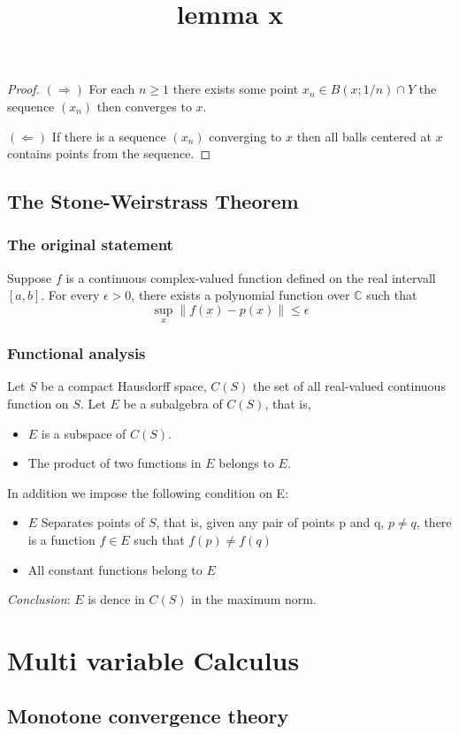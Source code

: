 \documentclass[titlepage]{article}
\begin{document}
\begin{proof}
\title{lemma x}
$(\Rightarrow)$ For each $n\geq 1$ there exists some point $x_n \in B(x;1/n)\cap Y$ the sequence $(x_n)$ then converges to $x$.

$(\Leftarrow)$  If there is a sequence $(x_n)$ converging to $x$ then all balls centered at $x$ contains points from the sequence.
\end{proof}
\subsection{The Stone-Weirstrass Theorem}
\subsubsection{The original statement}
Suppose $f$ is a continuous complex-valued function defined on the real intervall $[a,b]$. For every $\epsilon>0$, there exists a polynomial function over $\mathbb{C}$ such that 
\begin{equation}
\sup_x\| f(x) - p(x)\| \leq \epsilon
\end{equation}
\subsubsection{Functional analysis}
Let $S$ be a compact Hausdorff space, $C(S)$ the set of all real-valued continuous function on $S$. Let $E$ be a subalgebra of $C(S)$, that is,
\begin{itemize}
\item $E$ is a subspace of $C(S)$.
\item The product of two functions in $E$ belongs to $E$.
\end{itemize}
In addition we impose the following condition on E:
\begin{itemize}
\item $E$ Separates points of $S$, that is, given any pair of points p and q, $p\neq q$, there is a function $f\in E$ such that $f(p) \neq f(q)$
\item All constant functions belong to $E$
\end{itemize}
\textit{Conclusion}: $E$ is dence in $C(S)$ in the maximum norm.

\newpage
\section{Multi variable Calculus}
\subsection*{Monotone convergence theory}
\end{document}
